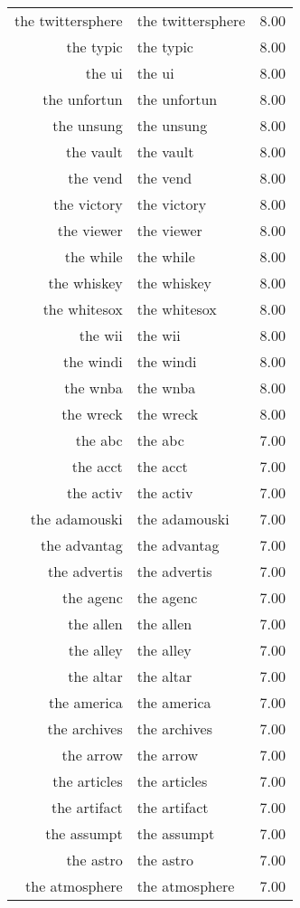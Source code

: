 \begin{table}[ht]
\begin{tabular}{rlr}
  the twittersphere & the twittersphere & 8.00 \\ 
  the typic & the typic & 8.00 \\ 
  the ui & the ui & 8.00 \\ 
  the unfortun & the unfortun & 8.00 \\ 
  the unsung & the unsung & 8.00 \\ 
  the vault & the vault & 8.00 \\ 
  the vend & the vend & 8.00 \\ 
  the victory & the victory & 8.00 \\ 
  the viewer & the viewer & 8.00 \\ 
  the while & the while & 8.00 \\ 
  the whiskey & the whiskey & 8.00 \\ 
  the whitesox & the whitesox & 8.00 \\ 
  the wii & the wii & 8.00 \\ 
  the windi & the windi & 8.00 \\ 
  the wnba & the wnba & 8.00 \\ 
  the wreck & the wreck & 8.00 \\ 
  the abc & the abc & 7.00 \\ 
  the acct & the acct & 7.00 \\ 
  the activ & the activ & 7.00 \\ 
  the adamouski & the adamouski & 7.00 \\ 
  the advantag & the advantag & 7.00 \\ 
  the advertis & the advertis & 7.00 \\ 
  the agenc & the agenc & 7.00 \\ 
  the allen & the allen & 7.00 \\ 
  the alley & the alley & 7.00 \\ 
  the altar & the altar & 7.00 \\ 
  the america & the america & 7.00 \\ 
  the archives & the archives & 7.00 \\ 
  the arrow & the arrow & 7.00 \\ 
  the articles & the articles & 7.00 \\ 
  the artifact & the artifact & 7.00 \\ 
  the assumpt & the assumpt & 7.00 \\ 
  the astro & the astro & 7.00 \\ 
  the atmosphere & the atmosphere & 7.00 \\ 

\end{tabular}
\end{table}
